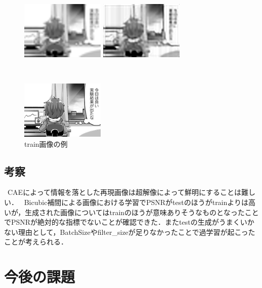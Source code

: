 \documentclass[twocolumn]{ujarticle}     %
\begin{document}
\begin{figure}[h]
      \begin{minipage}[t]{}
		\centering
		\includegraphics[width=40mm]{4scale_test.png}
      \end{minipage}  
	\begin{minipage}[t]{}
        \centering
        \includegraphics[width=40mm]{cae_test_decoded.png}
      \end{minipage} \\
      \begin{minipage}[t]{}
        \centering
        \includegraphics[width=40mm]{test_original.png}
      \end{minipage}
\caption{train画像の例\label{fig:test}}
  \end{figure}

\subsection{考察}
\ CAEによって情報を落とした再現画像は超解像によって鮮明にすることは難しい．
\ Bicubic補間による画像における学習でPSNRがtestのほうがtrainよりは高いが，生成された画像についてはtrainのほうが意味ありそうなものとなったことでPSNRが絶対的な指標でないことが確認できた．またtestの生成がうまくいかない理由として，BatchSizeやfilter\_sizeが足りなかったことで過学習が起こったことが考えられる．
\section{今後の課題}
\ 



\end{document}
